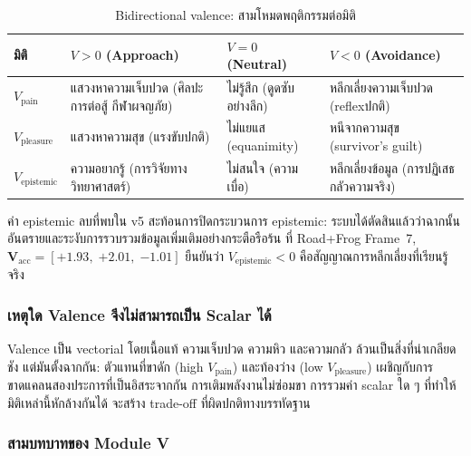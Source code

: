 \documentclass[12pt,a4paper]{article}
\newcommand{\vpain}{V_{\mathrm{pain}}}
\newcommand{\vpleasure}{V_{\mathrm{pleasure}}}
\newcommand{\vepi}{V_{\mathrm{epistemic}}}
\begin{document}
\begin{table}[!htbp]
\centering
\caption{Bidirectional valence: สามโหมดพฤติกรรมต่อมิติ}
\label{tab:bidirectional}
\small
\begin{tabular}{@{}L{1.8cm}L{4.0cm}L{3.4cm}L{3.4cm}@{}}
\toprule
\textbf{มิติ} & \textbf{$V > 0$ (Approach)}
  & \textbf{$V = 0$ (Neutral)} & \textbf{$V < 0$ (Avoidance)} \\
\midrule
$\vpain$ &
  แสวงหาความเจ็บปวด (ศิลปะการต่อสู้ กีฬาผจญภัย) &
  ไม่รู้สึก (ดูดซับอย่างลึก) &
  หลีกเลี่ยงความเจ็บปวด (reflexปกติ) \\
$\vpleasure$ &
  แสวงหาความสุข (แรงขับปกติ) &
  ไม่แยแส (equanimity) &
  หนีจากความสุข (survivor's guilt) \\
$\vepi$ &
  ความอยากรู้ (การวิจัยทางวิทยาศาสตร์) &
  ไม่สนใจ (ความเบื่อ) &
  หลีกเลี่ยงข้อมูล (การปฏิเสธ กลัวความจริง) \\
\bottomrule
\end{tabular}
\end{table}

ค่า epistemic ลบที่พบใน v5 สะท้อนการปิดกระบวนการ epistemic:
ระบบได้ตัดสินแล้วว่าฉากนั้นอันตรายและระงับการรวบรวมข้อมูลเพิ่มเติมอย่างกระตือรือร้น
ที่ Road+Frog Frame~7, $\mathbf{V}_{\mathrm{acc}} =
[{+1.93},\;{+2.01},\;{-1.01}]$ ยืนยันว่า $\vepi < 0$
คือสัญญาณการหลีกเลี่ยงที่เรียนรู้จริง

\subsubsection{เหตุใด Valence จึงไม่สามารถเป็น Scalar ได้}

Valence เป็น vectorial โดยเนื้อแท้ ความเจ็บปวด ความหิว และความกลัว
ล้วนเป็นสิ่งที่น่าเกลียดชัง แต่มันตั้งฉากกัน:
ตัวแทนที่ขาดัก (high $\vpain$) และท้องว่าง (low $\vpleasure$)
เผชิญกับการขาดแคลนสองประการที่เป็นอิสระจากกัน
การเติมพลังงานไม่ซ่อมขา การรวมค่า scalar ใด ๆ ที่ทำให้มิติเหล่านี้หักล้างกันได้
จะสร้าง trade-off ที่ผิดปกติทางบรรทัดฐาน

\subsubsection{สามบทบาทของ Module V}
\end{document}
